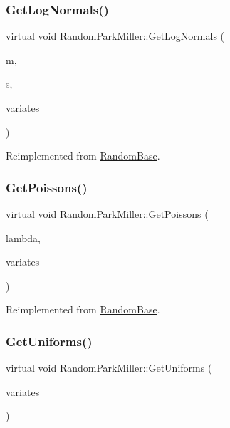 \subsubsection{\texorpdfstring{Get\+Log\+Normals()}{GetLogNormals()}}
{\footnotesize\ttfamily virtual void Random\+Park\+Miller\+::\+Get\+Log\+Normals (\begin{DoxyParamCaption}\item[{double}]{m,  }\item[{double}]{s,  }\item[{\hyperlink{classMJArray}{M\+J\+Array} \&}]{variates }\end{DoxyParamCaption})\hspace{0.3cm}{\ttfamily [virtual]}}



Reimplemented from \hyperlink{classRandomBase_a734f1712b1179fb31380e04da4a27f20}{Random\+Base}.

\hypertarget{classRandomParkMiller_adcc2619058ca8a30dab9618a54c82dd2}{}\label{classRandomParkMiller_adcc2619058ca8a30dab9618a54c82dd2} 
\subsubsection{\texorpdfstring{Get\+Poissons()}{GetPoissons()}}
{\footnotesize\ttfamily virtual void Random\+Park\+Miller\+::\+Get\+Poissons (\begin{DoxyParamCaption}\item[{double}]{lambda,  }\item[{\hyperlink{classMJArray}{M\+J\+Array} \&}]{variates }\end{DoxyParamCaption})\hspace{0.3cm}{\ttfamily [virtual]}}



Reimplemented from \hyperlink{classRandomBase_aa2e79f1f4c55c36df9c701d29e9b08a5}{Random\+Base}.

\hypertarget{classRandomParkMiller_a3dbbbb95c40e2a8794659fa38630b784}{}\label{classRandomParkMiller_a3dbbbb95c40e2a8794659fa38630b784} 
\subsubsection{\texorpdfstring{Get\+Uniforms()}{GetUniforms()}\hspace{0.1cm}{\footnotesize\ttfamily [1/2]}}
{\footnotesize\ttfamily virtual void Random\+Park\+Miller\+::\+Get\+Uniforms (\begin{DoxyParamCaption}\item[{\hyperlink{classMJArray}{M\+J\+Array} \&}]{variates }\end{DoxyParamCaption})\hspace{0.3cm}{\ttfamily [virtual]}}



